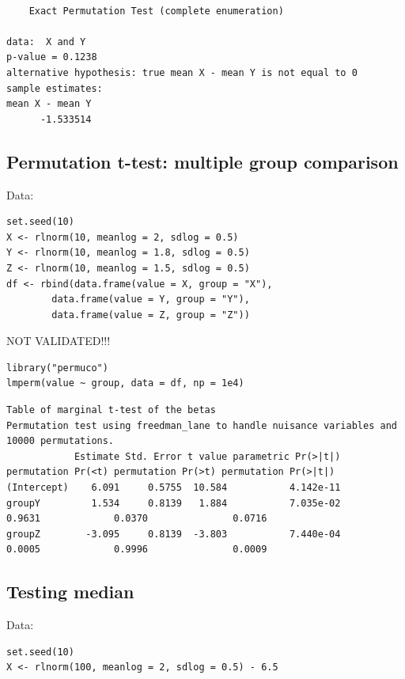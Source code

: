 \documentclass{article}
\begin{document}
\begin{verbatim}

	Exact Permutation Test (complete enumeration)

data:  X and Y
p-value = 0.1238
alternative hypothesis: true mean X - mean Y is not equal to 0
sample estimates:
mean X - mean Y 
      -1.533514
\end{verbatim}

\subsection{Permutation t-test: multiple group comparison}
\label{sec:org5fd89f7}
Data:
\lstset{language=r,label= ,caption= ,captionpos=b,numbers=none}
\begin{lstlisting}
set.seed(10)
X <- rlnorm(10, meanlog = 2, sdlog = 0.5)
Y <- rlnorm(10, meanlog = 1.8, sdlog = 0.5)
Z <- rlnorm(10, meanlog = 1.5, sdlog = 0.5)
df <- rbind(data.frame(value = X, group = "X"),
	    data.frame(value = Y, group = "Y"),
	    data.frame(value = Z, group = "Z"))
\end{lstlisting}

NOT VALIDATED!!! 
\lstset{language=r,label= ,caption= ,captionpos=b,numbers=none}
\begin{lstlisting}
library("permuco")
lmperm(value ~ group, data = df, np = 1e4)
\end{lstlisting}

\begin{verbatim}
Table of marginal t-test of the betas
Permutation test using freedman_lane to handle nuisance variables and 10000 permutations.
            Estimate Std. Error t value parametric Pr(>|t|) permutation Pr(<t) permutation Pr(>t) permutation Pr(>|t|)
(Intercept)    6.091     0.5755  10.584           4.142e-11                                                           
groupY         1.534     0.8139   1.884           7.035e-02             0.9631             0.0370               0.0716
groupZ        -3.095     0.8139  -3.803           7.440e-04             0.0005             0.9996               0.0009
\end{verbatim}

\subsection{Testing median}
\label{sec:org52d68d5}

Data:
\lstset{language=r,label= ,caption= ,captionpos=b,numbers=none}
\begin{lstlisting}
set.seed(10)
X <- rlnorm(100, meanlog = 2, sdlog = 0.5) - 6.5
\end{lstlisting}
\end{document}
